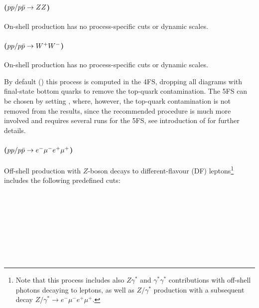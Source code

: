 \documentclass[english,11pt]{article}
\begin{document}
\paragraph{ ($pp/p\bar{p}\to ZZ$)}
On-shell \zz{} production \cite{Cascioli:2014yka} has no process-specific cuts or dynamic scales.


\paragraph{ ($pp/p\bar{p}\to W^+W^-$)}
On-shell \ww{} production \cite{Gehrmann:2014fva,Grazzini:2016ctr} has no process-specific cuts or dynamic scales. 

By default () this process is computed in the 4FS, dropping 
all diagrams with final-state bottom quarks to remove the top-quark contamination. 
The 5FS can be chosen by setting , where, however, 
the top-quark contamination is not removed from the results, since the recommended procedure is much more 
involved and requires several runs for the 5FS, see introduction of  for further details.

\paragraph{ ($pp/p\bar{p}\to e^- \mu^- e^+ \mu^+$)}

Off-shell \zz{} production \cite{Grazzini:2015hta} with $Z$-boson decays to different-flavour (DF) 
leptons\footnote{Note that this process includes also $Z\gamma^\ast$ and $\gamma^\ast\gamma^\ast$ contributions with off-shell photons decaying to leptons,
as well as $Z/\gamma^\ast$ production with a subsequent decay $Z/\gamma^\ast\to e^- \mu^- e^+ \mu^+$.} 
includes the following predefined cuts:

\\
\hyperref[M_leplep_OSSF]{\hspace*{3.04cm}}\\
\\
\\
\\
\\
\\
\end{document}
